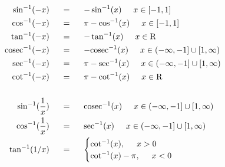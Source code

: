 \begin{align*}
\hspace{20mm} \sin^{-1}(-x)  \hspace{5mm} &= \hspace{5mm} -\sin^{-1}(x) \hspace{5mm} x \in [-1,1] \\
\hspace{20mm} \cos^{-1}(-x)  \hspace{5mm} &= \hspace{5mm} \pi - \cos^{-1}(x) \hspace{5mm} x \in [-1,1] \\
\hspace{20mm} \tan^{-1}(-x)  \hspace{5mm} &= \hspace{5mm} -\tan^{-1}(x) \hspace{5mm} x \in \mathrm{R} \\
\hspace{20mm} \mathrm{cosec}^{-1}(-x)  \hspace{5mm} &= \hspace{5mm} -\mathrm{cosec}^{-1}(x) \hspace{5mm} x \in (-\infty,-1] \cup [1,\infty)\\
\hspace{20mm} \mathrm{sec}^{-1}(-x)  \hspace{5mm} &= \hspace{5mm} \pi-\mathrm{sec}^{-1}(x) \hspace{5mm} x \in (-\infty,-1] \cup [1,\infty)\\
\hspace{20mm} \cot^{-1}(-x)  \hspace{5mm} &= \hspace{5mm} \pi -\cot^{-1}(x) \hspace{5mm} x \in \mathrm{R} \\ \\
\hspace{20mm} \sin^{-1}(\frac{1}{x})  \hspace{5mm} &= \hspace{5mm} \mathrm{cosec}^{-1}(x) \hspace{5mm} x \in (-\infty,-1] \cup [1,\infty)\\
\hspace{20mm} \cos^{-1}(\frac{1}{x})  \hspace{5mm} &= \hspace{5mm} \mathrm{sec}^{-1}(x) \hspace{5mm} x \in (-\infty,-1] \cup [1,\infty)\\
\tan^{-1}(1/x) \hspace{5mm} &= \hspace{5mm}
\begin{cases}
\cot^{-1}(x), \hspace{5mm}   x > 0 \\
\cot^{-1}(x) - \pi, \hspace{5mm} x < 0\\
\end{cases}
\end{align*} 


